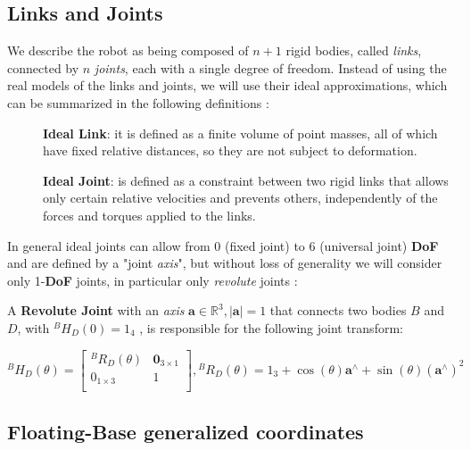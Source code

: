     \subsection{Links and Joints}
    \label{subsec: Links and Joints}

    We describe the robot as being composed of $n + 1$ rigid bodies, called \textit{links}, connected by $n$ \textit{joints}, each with a single degree of freedom. Instead of using the real models of the links and joints, we will use their ideal approximations, which can be summarized in the following definitions \cite{Duindam-phd-thesis}:


    \begin{description}
        \item[] \textbf{Ideal Link}: it is defined as a finite volume of point masses, all of which have fixed relative distances, so they are not subject to deformation.
        \item[] \textbf{Ideal Joint}: is defined as a constraint between two rigid links that allows
        only certain relative velocities and prevents others, independently of the forces and torques applied to the links.        
    \end{description}

    In general ideal joints can allow from 0 (fixed joint) to 6 (universal joint) \textbf{DoF} and are defined by a "joint \textit{axis}", but without loss of generality we will consider only 1-\textbf{DoF} joints, in particular only \textit{revolute} joints \cite{Traversaro2017thesis}:

    A \textbf{Revolute Joint} with an \textit{axis} $\mathbf{a} \in \mathbb{R}^3, |\mathbf{a}| =1$ that connects two bodies $B$ and $D$, with  ${}^{B}H_{D} (0) = 1_4$ , is responsible for the following joint transform: 

    \begin{equation}
         {}^{B}H_{D}(\theta) = \begin{bmatrix}
             {}^{B}R_{D}(\theta) & \mathbf{0}_{3 \times 1} \\
             0_{1 \times 3} & 1 \\
         \end{bmatrix} , {}^{B}R_{D}(\theta) = 1_3 + \cos(\theta)\mathbf{a}^{\wedge} + \sin(\theta)(\mathbf{a}^{\wedge})^2
    \label{eq: Revolute joint transformation}
    \end{equation}

    \subsection{Floating-Base generalized coordinates}
    \label{subsec: Floating-Base generalized coordinates}

